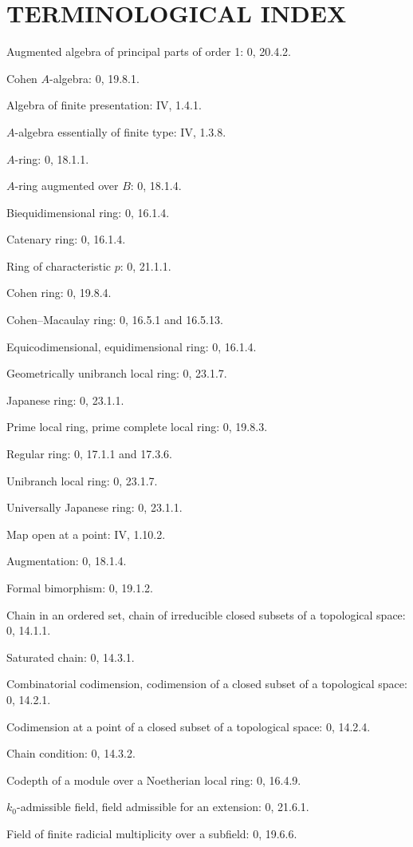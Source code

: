 \clearpage
{}
{}

\section*{TERMINOLOGICAL INDEX}

Augmented algebra of principal parts of order 1: 0, 20.4.2.\par
Cohen $A$-algebra: 0, 19.8.1.\par
Algebra of finite presentation: IV, 1.4.1.\par
$A$-algebra essentially of finite type: IV, 1.3.8.\par
$A$-ring: 0, 18.1.1.\par
$A$-ring augmented over $B$: 0, 18.1.4.\par
Biequidimensional ring: 0, 16.1.4.\par
Catenary ring: 0, 16.1.4.\par
Ring of characteristic $p$: 0, 21.1.1.\par
Cohen ring: 0, 19.8.4.\par
Cohen--Macaulay ring: 0, 16.5.1 and 16.5.13.\par
Equicodimensional, equidimensional ring: 0, 16.1.4.\par
Geometrically unibranch local ring: 0, 23.1.7.\par
Japanese ring: 0, 23.1.1.\par
Prime local ring, prime complete local ring: 0, 19.8.3.\par
Regular ring: 0, 17.1.1 and 17.3.6.\par
Unibranch local ring: 0, 23.1.7.\par
Universally Japanese ring: 0, 23.1.1.\par
Map open at a point: IV, 1.10.2.\par
Augmentation: 0, 18.1.4.\par

Formal bimorphism: 0, 19.1.2.\par

Chain in an ordered set, chain of irreducible closed subsets of a topological space: 0, 14.1.1.\par
Saturated chain: 0, 14.3.1.\par
Combinatorial codimension, codimension of a closed subset of a topological space: 0, 14.2.1.\par
Codimension at a point of a closed subset of a topological space: 0, 14.2.4.\par
Chain condition: 0, 14.3.2.\par
Codepth of a module over a Noetherian local ring: 0, 16.4.9.\par
$k_0$-admissible field, field admissible for an extension: 0, 21.6.1.\par
Field of finite radicial multiplicity over a subfield: 0, 19.6.6.\par

